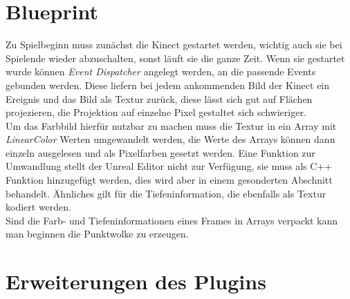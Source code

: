 \documentclass[a4paper]{IEEEtran}
\begin{document}
\section{Blueprint}
Zu Spielbeginn muss zunächst die Kinect gestartet werden, wichtig auch sie bei Spielende wieder abzuschalten, sonst läuft sie die ganze Zeit. Wenn sie gestartet wurde können {\textit{Event Dispatcher}} angelegt werden, an die passende Events gebunden werden. Diese liefern bei jedem ankommenden Bild der Kinect ein Ereignis und das Bild als Textur zurück, diese lässt sich gut auf Flächen projezieren, die Projektion auf einzelne Pixel gestaltet sich schwieriger. \\
Um das Farbbild hierfür nutzbar zu machen muss die Textur in ein Array mit {\textit{LinearColor}} Werten umgewandelt werden, die Werte des Arrays können dann einzeln ausgelesen und als Pixelfarben gesetzt werden. Eine Funktion zur Umwandlung stellt der Unreal Editor nicht zur Verfügung, sie muss als C++ Funktion hinzugefügt werden, dies wird aber in einem gesonderten Abschnitt behandelt. Ähnliches gilt für die Tiefeninformation, die ebenfalls als Textur kodiert werden. \\
Sind die Farb- und Tiefeninformationen eines Frames in Arrays verpackt kann man beginnen die Punktwolke zu erzeugen.

\section{Erweiterungen des Plugins}
\end{document}
